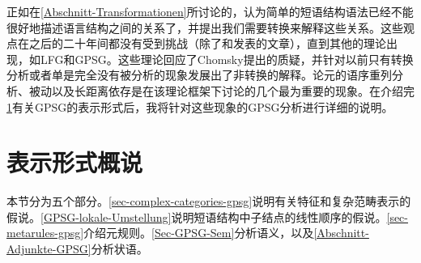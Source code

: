 正如在\ref{Abschnitt-Transformationen}所讨论的，\citet{Chomsky57a}认为简单的短语结构语法已经不能很好地描述语言结构之间的关系了，并提出我们需要转换来解释这些关系。这些观点在之后的二十年间都没有受到挑战（除了和发表的文章），直到其他的理论出现，如LFG和GPSG。这些理论回应了Chomsky提出的质疑，并针对以前只有转换分析或者单是完全没有被分析的现象发展出了非转换的解释。论元的语序重列分析、被动以及长距离依存是在该理论框架下讨论的几个最为重要的现象。在介绍完\ref{sec-Representationsformat}有关GPSG的表示形式后，我将针对这些现象的GPSG分析进行详细的说明。

\section{表示形式概说}
\label{sec-Representationsformat}

本节分为五个部分。\ref{sec-complex-categories-gpsg}说明有关特征和复杂范畴表示的假说。\ref{GPSG-lokale-Umstellung}说明短语结构中子结点的线性顺序的假说。\ref{sec-metarules-gpsg}介绍元规则。\ref{Sec-GPSG-Sem}分析语义，以及\ref{Abschnitt-Adjunkte-GPSG}分析状语。

